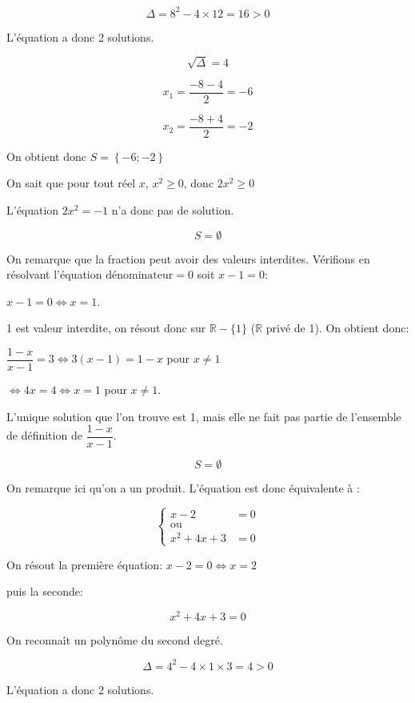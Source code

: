 \documentclass[a4paper,12pt]{scrartcl}
\begin{document}
$$\Delta = 8^2 - 4 \times 12 = 16 > 0$$

L'équation a donc 2 solutions.

$$\sqrt{\Delta} = 4$$

$$x_1 = \dfrac{-8 - 4}{2} = -6$$

$$x_2 = \dfrac{-8 + 4}{2} = -2$$

On obtient donc $S = \left\{ -6;-2\right\}$


On sait que pour tout réel $x$, $x^2 \geqslant 0$, donc $2x^2 \geqslant 0$

L'équation $2x^2 = -1$ n'a donc pas de solution.

$$S = \emptyset$$


On remarque que la fraction peut avoir des valeurs interdites. Vérifions en résolvant l'équation \og{}$\mbox{dénominateur} = 0$ \fg{}   soit $x-1 = 0$:

$x-1 = 0 \Leftrightarrow x = 1$. 

1 est valeur interdite, on résout donc sur $\mathbb{R} - \{1\}$ ($\mathbb{R}$ privé de 1). On obtient donc:

$\dfrac{1-x}{x-1} = 3 \Leftrightarrow 3(x-1) = 1-x$ pour $x \neq 1$

$\Leftrightarrow 4x = 4 \Leftrightarrow x=1$ pour $x \neq 1$.

L'unique solution que l'on trouve est 1, mais elle ne fait pas partie de l'ensemble de définition de $\dfrac{1-x}{x-1}$.

$$S = \emptyset$$



On remarque ici qu'on a un produit. L'équation est donc équivalente à :

$$
\begin{cases} 
x-2 &= 0 \\
\mbox{ou} & \\
x^2 + 4x + 3 &= 0
\end{cases}
$$

On résout la première équation: $x - 2 = 0 \Leftrightarrow x = 2$

puis la seconde:

$$x^2 + 4x + 3 = 0$$

On reconnaît un polynôme du second degré.

$$\Delta = 4^2 - 4 \times 1 \times 3 = 4 > 0$$

L'équation a donc 2 solutions.
\end{document}
